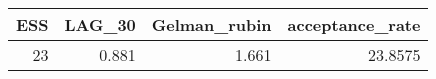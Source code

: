 \begin{longtable}{rrrr}
\toprule
ESS & LAG\_30 & Gelman\_rubin & acceptance\_rate \\ 
\midrule
23 & 0.881 & 1.661 & 23.8575 \\ 
\bottomrule
\end{longtable}

